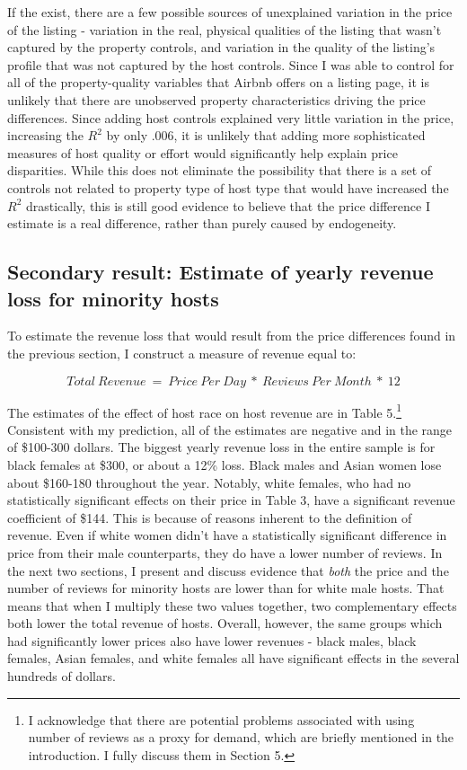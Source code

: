 \documentclass[11pt, oneside]{article}
\begin{document}
If the exist, there are a few possible sources of unexplained variation in the price of the listing - variation in the real, physical qualities of the listing that wasn't captured by the property controls, and variation in the quality of the listing's profile that was not captured by the host controls. Since I was able to control for all of the property-quality variables that Airbnb offers on a listing page, it is unlikely that there are unobserved property characteristics driving the price differences. Since adding host controls explained very little variation in the price, increasing the $R^2$ by only .006, it is unlikely that adding more sophisticated measures of host quality or effort would significantly help explain price disparities. While this does not eliminate the possibility that there is a set of controls not related to property type of host type that would have increased the $R^2$ drastically, this is still good evidence to believe that the price difference I estimate is a real difference, rather than purely caused by endogeneity. 


\subsection{Secondary result: Estimate of yearly revenue loss for minority hosts}

To estimate the revenue loss that would result from the price differences found in the previous section, I construct a measure of revenue equal to: 

\[Total \: Revenue \ = \ Price \: Per \: Day \ * \ Reviews \: Per \: Month \ * \ 12\] 

The estimates of the effect of host race on host revenue are in Table 5.\footnote{I acknowledge that there are potential problems associated with using number of reviews as a proxy for demand, which are briefly mentioned in the introduction. I fully discuss them in Section 5.} Consistent with my prediction, all of the estimates are negative and in the range of \$100-300 dollars. The biggest yearly revenue loss in the entire sample is for black females at \$300, or about a 12\% loss. Black males and Asian women lose about \$160-180 throughout the year. Notably, white females, who had no statistically significant effects on their price in Table 3, have a significant revenue coefficient of \$144. This is because of reasons inherent to the definition of revenue. Even if white women didn't have a statistically significant difference in price from their male counterparts, they do have a lower number of reviews. In the next two sections, I present and discuss evidence that \textit{both} the price and the number of reviews for minority hosts are lower than for white male hosts. That means that when I multiply these two values together, two complementary effects both lower the total revenue of hosts. Overall, however, the same groups which had significantly lower prices also have lower revenues - black males, black females, Asian females, and white females all have significant effects in the several hundreds of dollars. 
 
\end{document}
